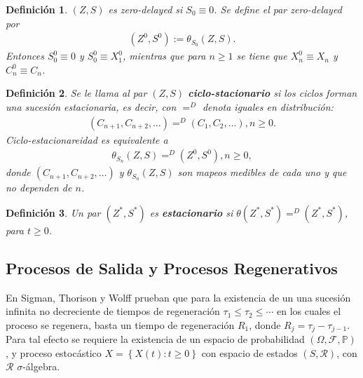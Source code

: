 \documentclass{article}
\newtheorem{Def}{Definición}[section]
\newcommand{\prob}{\mathbb{P}}
\numberwithin{equation}{section}
\begin{document}
\begin{Def}
$\left(Z,S\right)$ es \textit{zero-delayed} si $S_{0}\equiv0$. Se define el par \textit{zero-delayed} por
\begin{eqnarray}
\left(Z^{0},S^{0}\right):=\theta_{S_{0}}\left(Z,S\right).
\end{eqnarray}
Entonces $S_{0}^{0}\equiv0$ y $S_{0}^{0}\equiv X_{1}^{0}$, mientras que para $n\geq1$ se tiene que $X_{n}^{0}\equiv X_{n}$ y $C_{n}^{0}\equiv C_{n}$.
\end{Def}

\begin{Def}
Se le llama al par $\left(Z,S\right)$ \textbf{ciclo-stacionario} si los ciclos forman una sucesi\'on estacionaria, es decir, con $=^{D}$ denota iguales en distribuci\'on:
\begin{eqnarray}
\left(C_{n+1},C_{n+2},\ldots\right)=^{D}\left(C_{1},C_{2},\ldots\right),n\geq0.
\end{eqnarray}
Ciclo-estacionareidad es equivalente a 
\begin{eqnarray}
\theta_{S_{n}}\left(Z,S\right)=^{D}
\left(Z^{0},S^{0}\right),n\geq0,
\end{eqnarray}
donde $\left(C_{n+1},C_{n+2},\ldots\right)$ y $\theta_{S_{n}}\left(Z,S\right)$ son mapeos medibles de cada uno y que no dependen de $n$.
\end{Def}

\begin{Def}
Un par $\left(Z^{*},S^{*}\right)$ es \textbf{estacionario} si $\theta\left(Z^{*},S^{*}\right)=^{D}
\left(Z^{*},S^{*}\right)$, para $t\geq0$.
\end{Def}


%
\subsection*{Procesos de Salida y Procesos Regenerativos}
%
En Sigman, Thorison y Wolff \cite{Sigman2} prueban que para la existencia de un una sucesi\'on infinita no decreciente de tiempos de regeneraci\'on $\tau_{1}\leq\tau_{2}\leq\cdots$ en los cuales el proceso se regenera, basta un tiempo de regeneraci\'on $R_{1}$, donde $R_{j}=\tau_{j}-\tau_{j-1}$. Para tal efecto se requiere la existencia de un espacio de probabilidad $\left(\Omega,\mathcal{F},\prob\right)$, y proceso estoc\'astico $\textit{X}=\left\{X\left(t\right):t\geq0\right\}$ con espacio de estados $\left(S,\mathcal{R}\right)$, con $\mathcal{R}$ $\sigma$-\'algebra.
\end{document}
